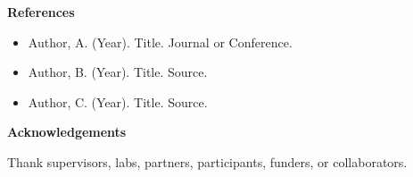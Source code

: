 
\textbf{References}

\begin{itemize}
  \item Author, A. (Year). Title. Journal or Conference.
  \item Author, B. (Year). Title. Source.
  \item Author, C. (Year). Title. Source.
\end{itemize}

\textbf{Acknowledgements}

Thank supervisors, labs, partners, participants, funders, or collaborators.

